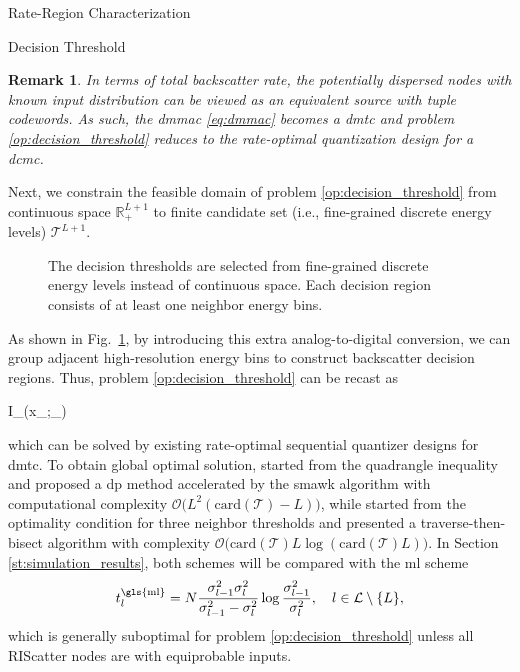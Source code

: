 \documentclass[journal]{IEEEtran}
\newtheorem{remark}{Remark}
\begin{document}
\begin{section}{Rate-Region Characterization}
\begin{subsection}{Decision Threshold}
		\begin{remark}
			In terms of total backscatter rate, the potentially dispersed nodes with known input distribution can be viewed as an equivalent source with tuple codewords.
			As such, the \gls{dmmac} \eqref{eq:dmmac} becomes a \gls{dmtc} and problem \eqref{op:decision_threshold} reduces to the rate-optimal quantization design for a \gls{dcmc}.
			\label{re:augmented_source}
		\end{remark}

		Next, we constrain the feasible domain of problem \eqref{op:decision_threshold} from continuous space $\mathbb{R}_+^{L+1}$ to finite candidate set (i.e., fine-grained discrete energy levels) $\mathcal{T}^{L+1}$.
		\begin{figure}[!t]
			\centering
			\resizebox{0.9\columnwidth}{!}{
				
			}
			\caption{The decision thresholds are selected from fine-grained discrete energy levels instead of continuous space. Each decision region consists of at least one neighbor energy bins.}
			\label{fg:discrete_outputs}
		\end{figure}
		As shown in Fig.~\ref{fg:discrete_outputs}, by introducing this extra analog-to-digital conversion, we can group adjacent high-resolution energy bins to construct backscatter decision regions.
		Thus, problem \eqref{op:decision_threshold} can be recast as
		\begin{maxi!}
			{}{I_{}(x_{};_{})}{\label{op:decision_threshold_discrete}}{\label{ob:decision_threshold_discrete}}
			\addConstraint{\eqref{co:sequential_threshold},}
		\end{maxi!}
		which can be solved by existing rate-optimal sequential quantizer designs for \gls{dmtc}.
		To obtain global optimal solution, \cite{He2021} started from the quadrangle inequality and proposed a \gls{dp} method accelerated by the \gls{smawk} algorithm with computational complexity $\mathcal{O}\bigl(L^2(\mathrm{card}(\mathcal{T})-L)\bigr)$, while \cite{Nguyen2020a} started from the optimality condition for three neighbor thresholds and presented a traverse-then-bisect algorithm with complexity $\mathcal{O}\bigl(\mathrm{card}(\mathcal{T})L\log(\mathrm{card}(\mathcal{T})L)\bigr)$.
		In Section \ref{st:simulation_results}, both schemes will be compared with the \gls{ml} scheme \cite{Qian2019}
		\begin{equation}
			t_{l}^{\text{\gls{ml}}} = N \frac{\sigma_{l-1}^2 \sigma_{l}^2}{\sigma_{l-1}^2 - \sigma_{l}^2} \log \frac{\sigma_{l-1}^2}{\sigma_{l}^2}, \quad l \in \mathcal{L} \setminus \{L\},
			\label{eq:detection_threshold_ml}
		\end{equation}
		which is generally suboptimal for problem \eqref{op:decision_threshold} unless all RIScatter nodes are with equiprobable inputs.
	\end{subsection}
\end{section}
\end{document}
